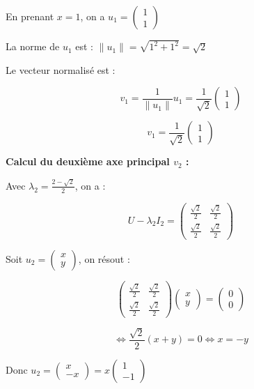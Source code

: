 \documentclass[11pt,a4paper]{article}
\begin{document}
En prenant $x = 1$, on a $u_1 = \begin{pmatrix} 1 \\ 1 \end{pmatrix}$

La norme de $u_1$ est : $\|u_1\| = \sqrt{1^2 + 1^2} = \sqrt{2}$

Le vecteur normalisé est :

$$v_1 = \frac{1}{\|u_1\|} u_1 = \frac{1}{\sqrt{2}} \begin{pmatrix} 1 \\ 1 \end{pmatrix}$$

$$\boxed{v_1 = \frac{1}{\sqrt{2}} \begin{pmatrix} 1 \\ 1 \end{pmatrix}}$$

\textbf{Calcul du deuxième axe principal $v_2$ :}

Avec $\lambda_2 = \frac{2 - \sqrt{2}}{2}$, on a :

$$U - \lambda_2 I_2 = \begin{pmatrix}
\frac{\sqrt{2}}{2} & \frac{\sqrt{2}}{2} \\
\frac{\sqrt{2}}{2} & \frac{\sqrt{2}}{2}
\end{pmatrix}$$

Soit $u_2 = \begin{pmatrix} x \\ y \end{pmatrix}$, on résout :

$$\begin{pmatrix}
\frac{\sqrt{2}}{2} & \frac{\sqrt{2}}{2} \\
\frac{\sqrt{2}}{2} & \frac{\sqrt{2}}{2}
\end{pmatrix} \begin{pmatrix} x \\ y \end{pmatrix} = \begin{pmatrix} 0 \\ 0 \end{pmatrix}$$

$$\Leftrightarrow \frac{\sqrt{2}}{2}(x + y) = 0 \Leftrightarrow x = -y$$

Donc $u_2 = \begin{pmatrix} x \\ -x \end{pmatrix} = x \begin{pmatrix} 1 \\ -1 \end{pmatrix}$
\end{document}
